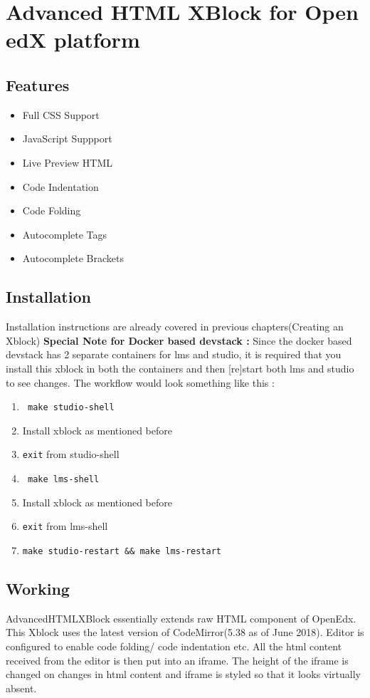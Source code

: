 \chapter{Advanced HTML XBlock for Open edX platform}

\section{Features}
\begin{itemize}
	\item Full CSS Support
	\item JavaScript Suppport
	\item Live Preview HTML
	\item Code Indentation
	\item Code Folding
	\item Autocomplete Tags
	\item Autocomplete Brackets
\end{itemize}

\section{Installation}
Installation instructions are already covered in previous chapters(Creating an Xblock)\newline
\textbf{Special Note for Docker based devstack :}\newline
Since the docker based devstack has 2 separate containers for lms and studio, it is required that you
install this xblock in both the containers and then [re]start both lms and studio to see changes.
The workflow would look something like this :
\begin{enumerate}
	\item \verb= make studio-shell=
	\item Install xblock as mentioned before
	\item \verb=exit= from studio-shell
	\item \verb= make lms-shell=
	\item Install xblock as mentioned before
	\item \verb=exit= from lms-shell
	\item \verb=make studio-restart && make lms-restart=
\end{enumerate}

\section{Working}
AdvancedHTMLXBlock essentially extends raw HTML component of OpenEdx. This Xblock uses
the latest version of CodeMirror(5.38 as of June 2018). Editor is configured to enable code folding/
code indentation etc. All the html content received from the editor is then put into an iframe. The
height of the iframe is changed on changes in html content and iframe is styled so that it looks
virtually absent.

